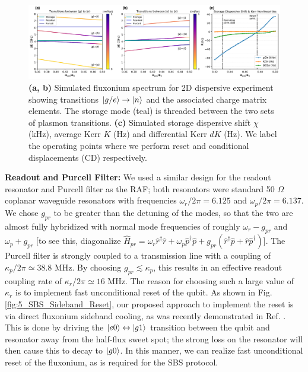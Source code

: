 \begin{figure}[h]
    \centering
    \includegraphics[width=\linewidth]{Figures/5/2D_dispersive_metrics.pdf}
    \caption{\textbf{(a, b)} Simulated fluxonium spectrum for 2D dispersive experiment showing transitions $\lvert g/e\rangle\to\lvert n\rangle$ and the associated charge matrix elements. The storage mode (teal) is threaded between the two sets of plasmon transitions. \textbf{(c)} Simulated storage dispersive shift $\chi$ (kHz), average Kerr $K$ (Hz) and differential Kerr $dK$ (Hz). We label the operating points where we perform reset and conditional displacements (CD) respectively.}
    \label{fig:5_2D_dispersive_metrics}
\end{figure}

\noindent \textbf{Readout and Purcell Filter:} We used a similar design for the readout resonator and Purcell filter as the RAF; both resonators were standard 50 $\Omega$ coplanar waveguide resonators with frequencies $\omega_r/2\pi = 6.125$ and $\omega_p/2\pi = 6.137$. We chose $g_{pr}$ to be greater than the detuning of the modes, so that the two are almost fully hybridized with normal mode frequencies of roughly $\omega_r - g_{pr}$ and $\omega_p + g_{pr}$ [to see this, diagonalize $\hat{H}_{pr} = \omega_r\hat{r}^\dagger \hat{r} + \omega_p\hat{p}^\dagger \hat{p} + g_{pr}(\hat{r}^\dagger\hat{p} + \hat{r}\hat{p}^\dagger)$]. The Purcell filter is strongly coupled to a transmission line with a coupling of $\kappa_p/2\pi \simeq 38.8$ MHz. By choosing $g_{pr} \lesssim \kappa_p$, this results in an effective readout coupling rate of $\kappa_r/2\pi \simeq 16$ MHz. The reason for choosing such a large value of $\kappa_r$ is to implement fast unconditional reset of the qubit. As shown in Fig. \ref{fig:5_SBS_Sideband_Reset}, our proposed approach to implement the reset is via direct fluxonium sideband cooling, as was recently demonstrated in Ref. \cite{najera2024high}. This is done by driving the $\lvert e0\rangle\leftrightarrow\lvert g1\rangle$ transition between the qubit and resonator away from the half-flux sweet spot; the strong loss on the resonator will then cause this to decay to $\lvert g0\rangle$. In this manner, we can realize fast unconditional reset of the fluxonium, as is required for the SBS protocol.

